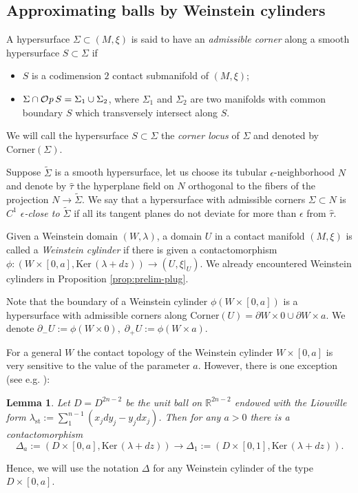 \documentclass[12pt]{amsart}
\theoremstyle{plain}
\newtheorem{lemma}[theorem]{Lemma}
\theoremstyle{definition}
\theoremstyle{remark}
\newcommand{\R}{\mathbb{R}}
\newcommand{\eps}{\epsilon}
\newcommand{\p}{\partial}
\newcommand{\wt}{\widetilde}
\newcommand{\wh}{\widehat}
\newcommand{\Ker}{\mathrm{Ker\,}}
\newcommand{\Op}{ {\mathcal O}{\it p}\,}
\newcommand{\corner}{\mathrm{Corner}}
\newcommand{\st}{\mathrm{st}}
\begin{document}
 
 \subsection{Approximating balls by Weinstein cylinders}\label{sec:approx-W-cyl-balls}
 A hypersurface $\Sigma\subset(M,\xi)$ is said to have an {\em admissible corner}  along a smooth hypersurface $S\subset\Sigma$ if 
 \begin{itemize}
 \item $S$ is a codimension $2$ contact submanifold of $(M,\xi)$;
 \item $\Sigma\cap\Op S=\Sigma_1\cup\Sigma_2$, where $\Sigma_1$ and $\Sigma_2$ are two manifolds with common boundary $S$ which transversely intersect along $S$. 
 \end{itemize}
 We will  call the hypersurface $S\subset \Sigma$   the {\em corner locus} of $\Sigma$ and denoted by $\corner(\Sigma)$.
 
 
  Suppose $\wt \Sigma$ is a smooth hypersurface, let us choose its tubular $\eps$-neighborhood $N$ and denote by $\wh \tau$ the hyperplane field on $N$ orthogonal to the fibers of the projection $N\to\wt \Sigma.$
  We say that  a hypersurface with admissible corners  $ \Sigma\subset N$  
  is  {\em $C^1$  $\eps$-close to  $\wt\Sigma$}
 if  all its tangent planes    do not deviate for more than $\eps$ from $\wh\tau$. 

 
 Given a Weinstein domain $(W,\lambda)$,  a domain $U$ in a
 contact manifold $(M,\xi)$ is called a {\em Weinstein cylinder}
 if there is given a  contactomorphism  $\phi:(W\times [0,a], \Ker(\lambda+dz))\to (U,\xi|_U)$.  We already encountered Weinstein cylinders in Proposition \ref{prop:prelim-plug}.
 
 
  
   Note that  the boundary of a Weinstein cylinder  $\phi(W\times[0,a])$ is a hypersurface with admissible corners along $\corner(U)=\p W\times 0  \cup \p W\times a$. We denote $\p_-U:=\phi(W\times 0),\; \p_+U:=\phi(W\times a)$.
      
For  a  general  $W$ the contact topology of the Weinstein cylinder $W\times[0,a]$ is very  sensitive to the value of the parameter $a$.  However, there is one exception (see e.g. \cite{EKP06}): 
 \begin{lemma}\label{lm:stand-Wein}
 Let $D=D^{2n-2}$ be the unit ball on $\R^{2n-2}$ endowed with the Liouville form $\lambda_\st:=\sum\limits_1^{n-1}(x_jdy_j-y_jdx_j)$.  Then for any $a>0$ there is a contactomorphism
 $$\Delta_a:=(D\times [0,a], \Ker(\lambda+dz))\to \Delta_1:=(D\times [0,1], \Ker(\lambda+dz)).$$
 \end{lemma}
Hence,  we will  use the notation $\Delta$   for any Weinstein cylinder of the type $D \times [0,a]. $
 
\end{document}
